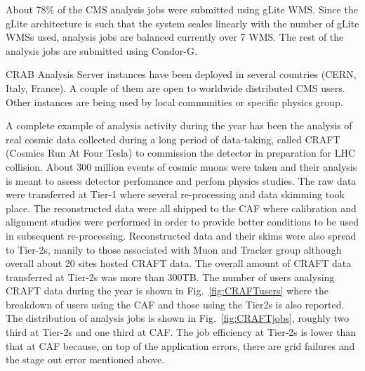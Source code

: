 About 78\% of the CMS analysis jobs were submitted using gLite WMS.  Since the gLite architecture is such that the system scales linearly with the number of gLite WMSs used, analysis jobs are balanced currently over 7 WMS. The rest of the analysis jobs are submitted using Condor-G.

CRAB Analysis Server instances have been deployed in several countries (CERN, Italy, France). A couple of them are open to worldwide distributed CMS users. Other instances are being used by local communities or specific physics group.

A complete example of analysis activity during the year has been the analysis 
of real cosmic data collected during a long period of data-taking, called CRAFT (Cosmics Run At Four Tesla) to commission the detector in preparation for LHC collision. About 300 million events of cosmic muons were taken and their analysis is meant to assess detector perfomance and perfom physics studies.
The raw data were transferred at Tier-1 where several re-processing and data skimming took place. The reconstructed data were all shipped to the CAF where calibration and alignment studies were performed in order to provide better conditions to be used in subsequent re-processing. 
Reconstructed data and their skims were also spread to Tier-2s, manily to 
those associated with Muon and Tracker group although overall about 20 sites hosted CRAFT data. The overall amount of CRAFT data transferred at Tier-2s was more than 300TB.
The number of users analysing CRAFT data during the year is shown in Fig.~\ref{fig:CRAFTusers} where the breakdown of users using the CAF and those using the Tier2s is also reported. The distribution of analysis jobs is shown in Fig.~\ref{fig:CRAFTjobs}, roughly two third at Tier-2s and one third at CAF.
The job efficiency at Tier-2s is lower than that at CAF because, on top of the application errors, there are grid failures and the stage out error mentioned above.
